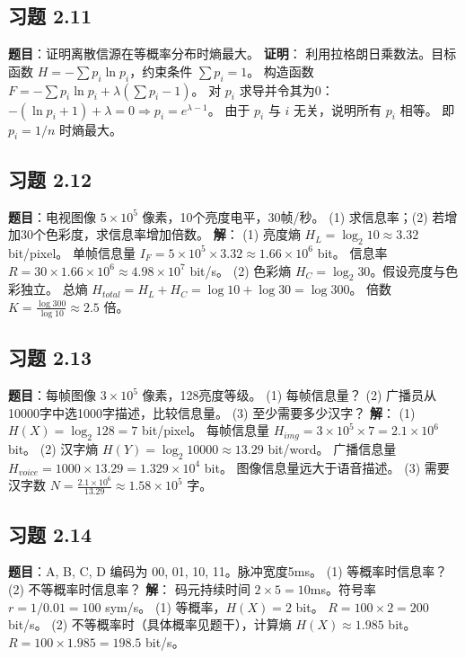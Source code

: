 \documentclass[11pt, a4paper]{article}
\begin{document}
\subsection*{习题 2.11}
\textbf{题目}：证明离散信源在等概率分布时熵最大。
\textbf{证明}：
利用拉格朗日乘数法。目标函数 $H = -\sum p_i \ln p_i$，约束条件 $\sum p_i = 1$。
构造函数 $F = -\sum p_i \ln p_i + \lambda (\sum p_i - 1)$。
对 $p_i$ 求导并令其为0：
$-(\ln p_i + 1) + \lambda = 0 \Rightarrow p_i = e^{\lambda - 1}$。
由于 $p_i$ 与 $i$ 无关，说明所有 $p_i$ 相等。
即 $p_i = 1/n$ 时熵最大。

\subsection*{习题 2.12}
\textbf{题目}：电视图像 $5 \times 10^5$ 像素，10个亮度电平，30帧/秒。
(1) 求信息率；(2) 若增加30个色彩度，求信息率增加倍数。
\textbf{解}：
(1) 亮度熵 $H_L = \log_2 10 \approx 3.32$ bit/pixel。
单帧信息量 $I_F = 5 \times 10^5 \times 3.32 \approx 1.66 \times 10^6$ bit。
信息率 $R = 30 \times 1.66 \times 10^6 \approx 4.98 \times 10^7$ bit/s。
(2) 色彩熵 $H_C = \log_2 30$。假设亮度与色彩独立。
总熵 $H_{total} = H_L + H_C = \log 10 + \log 30 = \log 300$。
倍数 $K = \frac{\log 300}{\log 10} \approx 2.5$ 倍。

\subsection*{习题 2.13}
\textbf{题目}：每帧图像 $3 \times 10^5$ 像素，128亮度等级。
(1) 每帧信息量？
(2) 广播员从10000字中选1000字描述，比较信息量。
(3) 至少需要多少汉字？
\textbf{解}：
(1) $H(X) = \log_2 128 = 7$ bit/pixel。
每帧信息量 $H_{img} = 3 \times 10^5 \times 7 = 2.1 \times 10^6$ bit。
(2) 汉字熵 $H(Y) = \log_2 10000 \approx 13.29$ bit/word。
广播信息量 $H_{voice} = 1000 \times 13.29 = 1.329 \times 10^4$ bit。
图像信息量远大于语音描述。
(3) 需要汉字数 $N = \frac{2.1 \times 10^6}{13.29} \approx 1.58 \times 10^5$ 字。

\subsection*{习题 2.14}
\textbf{题目}：A, B, C, D 编码为 00, 01, 10, 11。脉冲宽度5ms。
(1) 等概率时信息率？ (2) 不等概率时信息率？
\textbf{解}：
码元持续时间 $2 \times 5 = 10$ms。符号率 $r = 1/0.01 = 100$ sym/s。
(1) 等概率，$H(X) = 2$ bit。
$R = 100 \times 2 = 200$ bit/s。
(2) 不等概率时（具体概率见题干），计算熵 $H(X) \approx 1.985$ bit。
$R = 100 \times 1.985 = 198.5$ bit/s。
\end{document}
